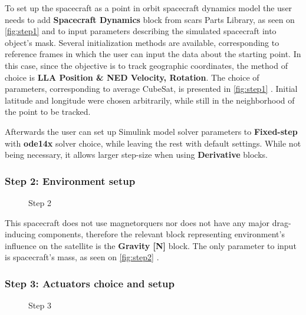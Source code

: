             To set up the spacecraft as a point in orbit spacecraft dynamics model the user needs to add \textbf{Spacecraft Dynamics} block from \ac{scars} Parts Library, as seen on \autoref{fig:step1}  and to input parameters describing the simulated spacecraft into object's mask. Several initialization methods are available, corresponding to reference frames in which the user can input the data about the starting point. In this case, since the objective is to track geographic coordinates, the method of choice is \textbf{LLA Position \& NED Velocity, Rotation}. The choice of parameters, corresponding to average CubeSat, is presented in \autoref{fig:step1} . Initial latitude and longitude were chosen arbitrarily, while still in the neighborhood of the point to be tracked.
            
            Afterwards the user can set up Simulink model solver parameters to \textbf{Fixed-step} with \textbf{ode14x} solver choice, while leaving the rest with default settings. While not being necessary, it allows larger step-size when using \textbf{Derivative} blocks.

        \subsubsection*{Step 2: Environment setup}
            \begin{figure}[H]
                \centering
                \qquad
                \caption{Step 2}%
                \label{fig:step2}%
            \end{figure}

            This spacecraft does not use magnetorquers nor does not have any major drag-inducing components, therefore the relevant block representing environment's influence on the satellite is the \textbf{Gravity [N]} block. The only parameter to input is spacecraft's mass, as seen on \autoref{fig:step2} .

        \subsubsection*{Step 3: Actuators choice and setup}
            \begin{figure}[H]
                \centering
                \qquad
                \caption{Step 3}%
                \label{fig:step3}%
            \end{figure}

